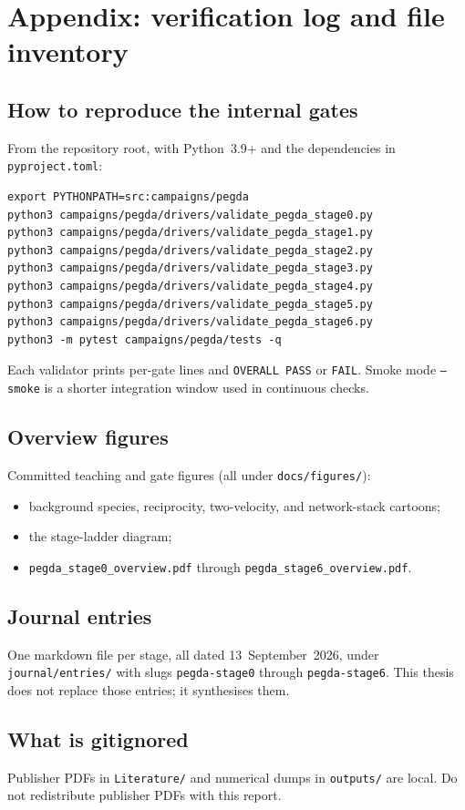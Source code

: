 \chapter{Appendix: verification log and file inventory}
\label{ch:app}

\section{How to reproduce the internal gates}

From the repository root, with Python~3.9+ and the dependencies in \texttt{pyproject.toml}:

\begin{verbatim}
export PYTHONPATH=src:campaigns/pegda
python3 campaigns/pegda/drivers/validate_pegda_stage0.py
python3 campaigns/pegda/drivers/validate_pegda_stage1.py
python3 campaigns/pegda/drivers/validate_pegda_stage2.py
python3 campaigns/pegda/drivers/validate_pegda_stage3.py
python3 campaigns/pegda/drivers/validate_pegda_stage4.py
python3 campaigns/pegda/drivers/validate_pegda_stage5.py
python3 campaigns/pegda/drivers/validate_pegda_stage6.py
python3 -m pytest campaigns/pegda/tests -q
\end{verbatim}

Each validator prints per-gate lines and \texttt{OVERALL PASS} or \texttt{FAIL}.
Smoke mode \texttt{--smoke} is a shorter integration window used in continuous checks.

\section{Overview figures}

Committed teaching and gate figures (all under \texttt{docs/figures/}):

\begin{itemize}
  \item background species, reciprocity, two-velocity, and network-stack cartoons;
  \item the stage-ladder diagram;
  \item \texttt{pegda\_stage0\_overview.pdf} through \texttt{pegda\_stage6\_overview.pdf}.
\end{itemize}

\section{Journal entries}

One markdown file per stage, all dated 13~September~2026, under \texttt{journal/entries/} with slugs \texttt{pegda-stage0} through \texttt{pegda-stage6}.
This thesis does not replace those entries; it synthesises them.

\section{What is gitignored}

Publisher PDFs in \texttt{Literature/} and numerical dumps in \texttt{outputs/} are local.
Do not redistribute publisher PDFs with this report.
